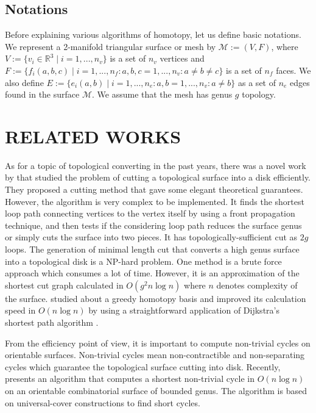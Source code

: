 \documentclass[a4paper,twoside]{article}
\begin{document}
\subsection*{Notations}
Before explaining various algorithms of homotopy, let us define basic notations. We represent a 2-manifold triangular surface or mesh by $\mathscr{M}:=(V,F)$, where $V:=\{ v_{i}\in \mathbb{R}^3 \mid i = 1, ... , n_v\}$ is a set of $n_v$ vertices and $F:=\{ f_{i}(a,b,c) \mid i = 1, ... , n_f : a,b,c = 1, ... , n_v : a \neq b \neq c\}$ is a set of $n_f$ faces. We also define $E:=\{ e_{i}(a,b) \mid i = 1, ... , n_e : a,b = 1, ... , n_v :  a \neq b\}$ as a set of $n_e$ edges found in the surface $\mathscr{M}$. We assume that the mesh has genus $g$ topology. 


\section{\uppercase{Related Works}}
\label{sec:related works}
\noindent As for a topic of topological converting in the past years, there was a novel work  by \cite{Erickson:2002:OCS:513400.513430} that studied the problem of cutting a topological surface into a disk efficiently. They proposed a cutting method that gave some elegant theoretical guarantees. However, the algorithm is very complex to be implemented. It finds the shortest loop path connecting vertices to the vertex itself by using a front propagation technique, and then tests if the considering loop path reduces the surface genus or simply cuts the surface into two pieces. It has topologically-sufficient cut as $2g$ loops. The generation of minimal length cut that converts a high genus surface into a topological disk is a NP-hard problem. One method is a brute force approach which consumes a lot of time. However, it is an approximation of the shortest cut graph calculated in $O(g^2 n \log n)$ where $n$ denotes complexity of the surface. \cite{Erickson:2005:GOH:1070432.1070581} studied about a greedy homotopy basis and improved its calculation speed in $O(n \log n)$
by using a straightforward application of Dijkstra's shortest path algorithm \cite{Dijkstra59anote}. 

From the efficiency point of view, it is important to compute non-trivial cycles on orientable surfaces. Non-trivial cycles mean non-contractible and non-separating cycles which guarantee the topological surface cutting into disk. Recently, \cite{Kutz:2006:CSN:1137856.1137919} presents an algorithm that computes a shortest non-trivial cycle in $O(n \log n)$ on an orientable combinatorial surface of bounded genus. The algorithm is based on universal-cover constructions to find short cycles.
\end{document}
